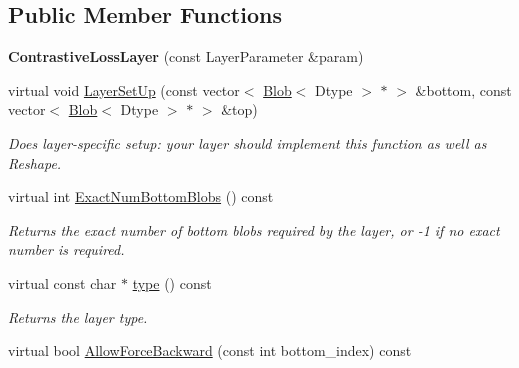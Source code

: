 \subsection*{Public Member Functions}
\begin{DoxyCompactItemize}
\item 
{\bfseries Contrastive\+Loss\+Layer} (const Layer\+Parameter \&param)\hypertarget{classcaffe_1_1ContrastiveLossLayer_aab41120fe462451196d14321264aef60}{}\label{classcaffe_1_1ContrastiveLossLayer_aab41120fe462451196d14321264aef60}

\item 
virtual void \hyperlink{classcaffe_1_1ContrastiveLossLayer_a34a16b3e6598ec6c23e63c01ef0c0a99}{Layer\+Set\+Up} (const vector$<$ \hyperlink{classcaffe_1_1Blob}{Blob}$<$ Dtype $>$ $\ast$ $>$ \&bottom, const vector$<$ \hyperlink{classcaffe_1_1Blob}{Blob}$<$ Dtype $>$ $\ast$ $>$ \&top)
\begin{DoxyCompactList}\small\item\em Does layer-\/specific setup\+: your layer should implement this function as well as Reshape. \end{DoxyCompactList}\item 
virtual int \hyperlink{classcaffe_1_1ContrastiveLossLayer_af1b8bcaf8ddacd3e98e26c558c7f49a0}{Exact\+Num\+Bottom\+Blobs} () const 
\begin{DoxyCompactList}\small\item\em Returns the exact number of bottom blobs required by the layer, or -\/1 if no exact number is required. \end{DoxyCompactList}\item 
virtual const char $\ast$ \hyperlink{classcaffe_1_1ContrastiveLossLayer_a34b18bace2b4419132d1364516da19f6}{type} () const \hypertarget{classcaffe_1_1ContrastiveLossLayer_a34b18bace2b4419132d1364516da19f6}{}\label{classcaffe_1_1ContrastiveLossLayer_a34b18bace2b4419132d1364516da19f6}

\begin{DoxyCompactList}\small\item\em Returns the layer type. \end{DoxyCompactList}\item 
virtual bool \hyperlink{classcaffe_1_1ContrastiveLossLayer_afbfe9d1707c9e76e31fe381af3d708ef}{Allow\+Force\+Backward} (const int bottom\+\_\+index) const 
\end{DoxyCompactItemize}
